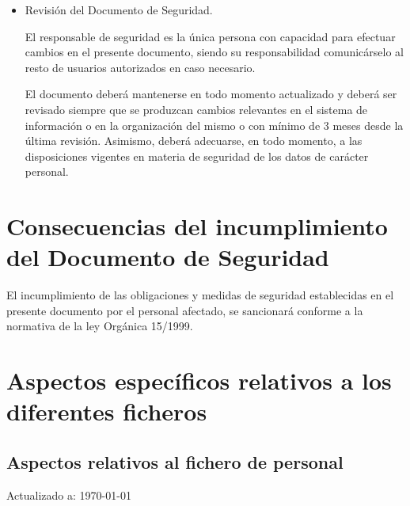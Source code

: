 \documentclass[a4paper,11pt,bibtotoc,noliststotoc]{scrbook}
\begin{document}
\begin{itemize}
\item Revisión del Documento de Seguridad.

El responsable de seguridad es la única persona con capacidad para efectuar cambios en el presente documento, siendo su responsabilidad comunicárselo al resto de usuarios autorizados en caso necesario.

El documento deberá mantenerse en todo momento actualizado y deberá ser revisado siempre que se produzcan cambios relevantes en el sistema de información o en la organización del mismo o con mínimo de 3 meses desde la última revisión. Asimismo, deberá adecuarse, en todo momento, a las disposiciones vigentes en materia de seguridad de los datos de carácter personal.


\end{itemize}


\chapter{Consecuencias del incumplimiento del Documento de Seguridad}

El incumplimiento de las obligaciones y medidas de seguridad establecidas en el presente documento por el personal afectado, se sancionará conforme a la normativa de la ley Orgánica 15/1999.








\appendix
\chapter{Aspectos específicos relativos a los diferentes ficheros}

\section{Aspectos relativos al fichero de personal}

Actualizado a: \today
\end{document}
